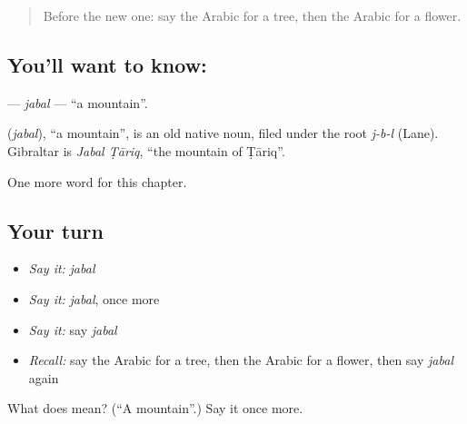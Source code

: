 \label{lesson:AR-C75-jabal}



\begin{quote}
Before the new one: say the Arabic for a tree, then the Arabic for a flower.
\end{quote}

\subsection*{You'll want to know: }
\textbf{} — \emph{jabal} — \textquotedblleft{}a mountain\textquotedblright{}.

\begin{cousinweb}
\textbf{} (\emph{jabal}), \textquotedblleft{}a mountain\textquotedblright{}, is an old native noun, filed under the root \emph{j-b-l} (Lane). Gibraltar is \emph{Jabal Ṭāriq}, \textquotedblleft{}the mountain of Ṭāriq\textquotedblright{}.
\end{cousinweb}

\begin{grammarlens}[title={What you've built}]
One more word for this chapter.
\end{grammarlens}

\subsection*{Your turn}
\begin{itemize}
\raggedright
  \item \emph{Say it:} \emph{jabal}
  \item \emph{Say it:} \emph{jabal}, once more
  \item \emph{Say it:} say \emph{jabal}
  \item \emph{Recall:} say the Arabic for a tree, then the Arabic for a flower, then say \emph{jabal} again
\end{itemize}

\begin{tcolorbox}[breakable,colback=teal!4,colframe=teal!35!black,title={Before you move on}]
What does  mean? (\textquotedblleft{}A mountain\textquotedblright{}.) Say it once more.
\end{tcolorbox}
